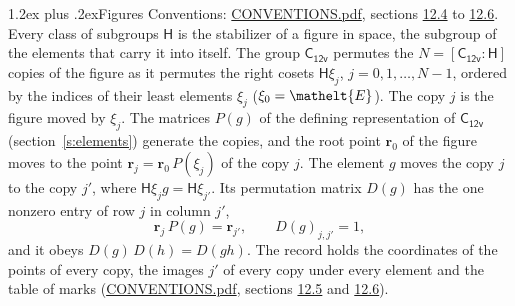 \documentclass[10pt,a4paper]{article}
\makeatletter
\renewcommand\section{\@startsection{section}{1}{\z@}{-3ex plus -1ex minus -.2ex}%
  {1.2ex plus .2ex}{\normalfont\large\sffamily\bfseries\color{parttitle}}}
\numberwithin{equation}{section}
\newcommand{\eltfont}[1]{{\let\sigma\eltsigma\mathelt{#1}}}
\newcommand{\grp}[1]{\mathsf{#1}}
\newcommand{\cls}[1]{\eltfont{#1}}
\newcommand{\pointr}{\mathbf{r}}
\makeatother
\begin{document}
\section{Figures}\label{s:permutation}
Conventions: \href{../../CONVENTIONS.pdf}{CONVENTIONS.pdf}, sections \href{../../CONVENTIONS.pdf\#conv.12.4}{12.4} to \href{../../CONVENTIONS.pdf\#conv.12.6}{12.6}.
Every class of subgroups $\grp{H}$ is the stabilizer of a figure in space, the subgroup of the elements that carry it into itself. \label{n:local.orbit.size}\label{n:element.coset.least}\label{n:index.coset}The group $\grp{C_{12v}}$ permutes the $N = [\grp{C_{12v}} : \grp{H}]$ copies of the figure as it permutes the right cosets $\grp{H}\xi_j$, $j = 0, 1, \dots, N - 1$, ordered by the indices of their least elements $\xi_j$ ($\xi_0 = \cls{E}$). The copy $j$ is the figure moved by $\xi_j$. The matrices $P(g)$ of the defining representation of $\grp{C_{12v}}$ (section~\ref{s:elements}) generate the copies, and the root point $\pointr_0$ of the figure moves to the point $\pointr_j = \pointr_0\, P(\xi_j)$ of the copy $j$. \label{n:local.coset.image}The element $g$ moves the copy $j$ to the copy $j'$, where $\grp{H}\xi_j g = \grp{H}\xi_{j'}$. \label{n:local.matrix.permutation}Its permutation matrix $D(g)$ has the one nonzero entry of row $j$ in column $j'$,
\begin{equation}\label{e:perm.matrix}\pointr_j\, P(g) = \pointr_{j'}, \qquad D(g)_{j,j'} = 1,\end{equation}
and it obeys $D(g)\, D(h) = D(gh)$. The record holds the coordinates of the points of every copy, the images $j'$ of every copy under every element and the table of marks (\href{../../CONVENTIONS.pdf}{CONVENTIONS.pdf}, sections \href{../../CONVENTIONS.pdf\#conv.12.5}{12.5} and \href{../../CONVENTIONS.pdf\#conv.12.6}{12.6}).
\end{document}
